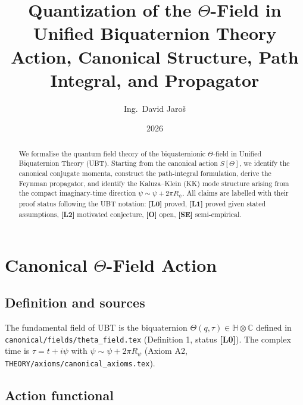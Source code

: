 \documentclass[11pt,a4paper]{article}
\title{Quantization of the \texorpdfstring{$\Theta$}{Theta}-Field in Unified Biquaternion Theory\\
\large Action, Canonical Structure, Path Integral, and Propagator}
\author{Ing.\ David Jaroš}
\date{2026}
\begin{document}
\maketitle

\begin{abstract}
We formalise the quantum field theory of the biquaternionic $\Theta$-field in
Unified Biquaternion Theory (UBT).  Starting from the canonical action
$S[\Theta]$, we identify the canonical conjugate momenta, construct the
path-integral formulation, derive the Feynman propagator, and identify the
Kaluza--Klein (KK) mode structure arising from the compact imaginary-time
direction $\psi \sim \psi + 2\pi R_\psi$.  All claims are labelled with their
proof status following the UBT notation: \textbf{[L0]} proved, \textbf{[L1]}
proved given stated assumptions, \textbf{[L2]} motivated conjecture,
\textbf{[O]} open, \textbf{[SE]} semi-empirical.
\end{abstract}

\tableofcontents

\section{Canonical \texorpdfstring{$\Theta$}{Theta}-Field Action}
\label{sec:action}

\subsection{Definition and sources}

The fundamental field of UBT is the biquaternion
$\Theta(q,\tau) \in \mathbb{H} \otimes \mathbb{C}$ defined in
\texttt{canonical/fields/theta\_field.tex} (Definition 1, status \textbf{[L0]}).
The complex time is $\tau = t + i\psi$ with $\psi \sim \psi + 2\pi R_\psi$
(Axiom A2, \texttt{THEORY/axioms/canonical\_axioms.tex}).

\subsection{Action functional}
\end{document}
